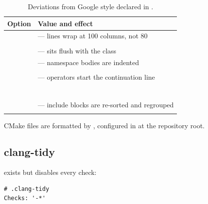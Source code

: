 \begin{table}[H]
  \centering
  \caption{Deviations from Google style declared in .}
  \label{tab:dev-clangformat}
  \small
  \begin{tabularx}{\textwidth}{lL}
    \toprule
    Option & Value and effect \\
    \midrule
        &  --- lines wrap at 100 columns, not 80 \\
        &  \\
     &  ---  sits flush with the class \\
     &  --- namespace bodies are indented \\
     &  \\
     &  --- operators start the continuation line \\
     &  \\
     &  \\
     &  \\
     &  \\
     &  \\
     &  \\
      &  --- include blocks are re-sorted and regrouped \\
     &  \\
    \bottomrule
  \end{tabularx}
\end{table}

CMake files are formatted by , configured in
 at the repository root.

\subsection{clang-tidy}

 exists but disables every check:

\begin{lstlisting}[language=yamlcfg]
# .clang-tidy
Checks: '-*'
\end{lstlisting}

